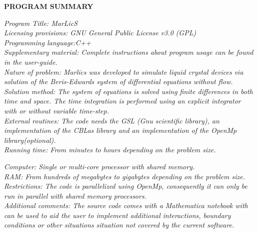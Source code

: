 \documentclass[final,5p,times,twocolumn]{elsarticle}
\begin{document}
 \linenumbers


{\bf PROGRAM SUMMARY}

\begin{small}
\noindent
{\em Program Title: MarLicS}\\

{\em Licensing provisions: GNU General Public License v3.0 (GPL) }\\

{\em Programming language:C++}\\

{\em Supplementary material: Complete instructions about program usage can be found in the user-guide. }\\

{\em Nature of problem: Marlics was developed to simulate liquid crystal devices via solution of the Beris-Edwards system of differential equations without flow.}\\

{\em Solution method:  The system of equations is solved using finite differences in both time and space. The time integration is performed using an explicit integrator with or without variable time-step.}\\

{\em External routines: The code needs the GSL (Gnu scientific library), an implementation of the CBLas library and an implementation of the OpenMp library(optional).}\\


{\em Running time: From minutes to hours depending on the problem size.}

{\em Computer: Single or multi-core processor with shared memory.}\\

{\em RAM: From hundreds of megabytes to gigabytes depending on the problem size.}\\


{\em Restrictions: The code is parallelized using OpenMp, consequently it can only be run in parallel with shared memory  processors.}\\

{\em Additional comments: The source code comes with a Mathematica
  notebook with can be used to aid the user to implement additional
  interactions, boundary conditions or other situations situation not
  covered by the current software.}

\end{small}
\end{document}
